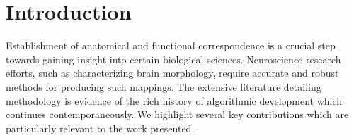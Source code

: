 \documentclass{frontiersSCNS}
\begin{document}
%
%
%







\section{Introduction}

Establishment of anatomical and functional correspondence
is a crucial step towards gaining insight into certain biological
sciences.  Neuroscience research efforts, such as characterizing
brain morphology, require accurate and robust methods for
producing such mappings.  The
extensive literature detailing methodology is evidence of the rich history of
algorithmic development which continues contemporaneously.
We highlight several key contributions which are particularly relevant to the work presented.
\end{document}
